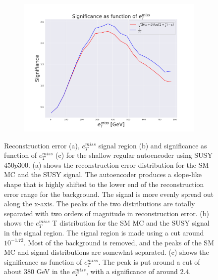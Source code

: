 \begin{figure}[h!]
    \hfill  
    \begin{subfigure}{.49\textwidth}
        \includegraphics[width=\textwidth]{Figures/AE_testing/small/2lep/significance_etmiss_450p0p0300_-1.7167506533614734.pdf}
        \caption{}
        \label{fig:AE_2lep_small_signi_450}
    \end{subfigure}
    \hfill      
    \caption[2lep shallow network | $450p300$ | AE]{Reconstruction error (a), $e_T^{miss}$ signal region (b) and significance as function of 
    $e_T^{miss}$ (c) for the shallow regular autoencoder using SUSY $450p300$. 
    (a) shows the reconstruction error distribution for the SM MC and the SUSY signal. 
    The autoencoder produces a slope-like shape that is highly shifted to the lower end of the reconstruction error range
for the background. The signal is more evenly spread out along the x-axis. The peaks of the two distributions are totally separated
with two orders of magnitude in reconstruction error. (b) shows the $e_T^{miss}$
T distribution for the SM MC and the SUSY signal in the signal region. The signal region is made using a cut around
$10^{-1.72}$. Most of the background is removed, and the peaks of the SM MC and signal distributions are
somewhat separated. (c) shows the significance as function of $e_T^{miss}$. The peak is put 
around a cut of about 380 GeV in the $e_T^{miss}$, with a significance of around $2.4$.}
    \label{fig:AE_2lep_small_rec_sig_signi_450}
\end{figure}



